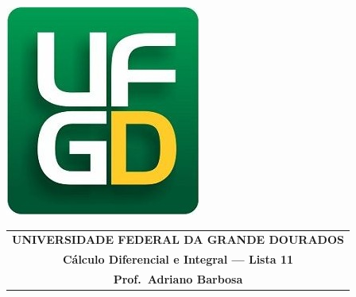 \documentclass[a4paper,5pt]{amsbook}
\begin{document}
\thispagestyle{empty}
\pagestyle{empty}
\begin{minipage}[h]{0.14\textwidth}
	\includegraphics[scale=0.24]{../ufgd.png}
\end{minipage}
\begin{minipage}[h]{\textwidth}
\begin{tabular}{c}
{{\bf UNIVERSIDADE FEDERAL DA GRANDE DOURADOS}}\\
{{\bf C\'alculo Diferencial e Integral --- Lista 11}}\\
{{\bf Prof.\ Adriano Barbosa}}\\
\end{tabular}
\vspace{-0.45cm}
%
\end{minipage}

\end{document}
